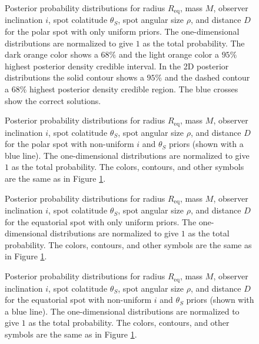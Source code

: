 \documentclass{wihuri}
\def\thetas{\theta_{S}}
\def\req{R_{\mathrm{eq}}}
\begin{document}
\begin{figure}
\centerline{}
\caption{Posterior probability distributions for radius $\req$, mass $M$, observer inclination $i$, spot colatitude $\thetas$, spot angular size $\rho$, and distance $D$ for the polar spot with only uniform priors. The one-dimensional distributions are normalized to give $1$ as the total probability. The dark orange color shows a $68 \%$ and the light orange color a $95 \%$ highest posterior density credible interval. In the 2D posterior distributions the solid contour shows a $95 \%$ and the dashed contour a $68 \%$ highest posterior density credible region. The blue crosses show the correct solutions. 
\label{fig:polpost}}
\end{figure}

\begin{figure}
\centerline{}
\caption{Posterior probability distributions for radius $\req$, mass $M$, observer inclination $i$, spot colatitude $\thetas$, spot angular size $\rho$, and distance $D$ for the polar spot with non-uniform $i$ and $\thetas$ priors (shown with a blue line). The one-dimensional distributions are normalized to give $1$ as the total probability. The colors, contours, and other symbols are the same as in Figure \ref{fig:polpost}. 
\label{fig:polpostpr}}
\end{figure}



\begin{figure}
\centerline{}
\caption{Posterior probability distributions for radius $\req$, mass $M$, observer inclination $i$, spot colatitude $\thetas$, spot angular size $\rho$, and distance $D$ for the equatorial spot with only uniform priors. The one-dimensional distributions are normalized to give $1$ as the total probability. The colors, contours, and other symbols are the same as in Figure \ref{fig:polpost}.
\label{fig:eqpost}}
\end{figure}



\begin{figure}
\centerline{}
\caption{Posterior probability distributions for radius $\req$, mass $M$, observer inclination $i$, spot colatitude $\thetas$, spot angular size $\rho$, and distance $D$ for the equatorial spot with non-uniform $i$ and $\thetas$ priors (shown with a blue line). The one-dimensional distributions are normalized to give $1$ as the total probability. The colors, contours, and other symbols are the same as in Figure \ref{fig:polpost}.
\label{fig:eqpostpr}}
\end{figure}
\end{document}
